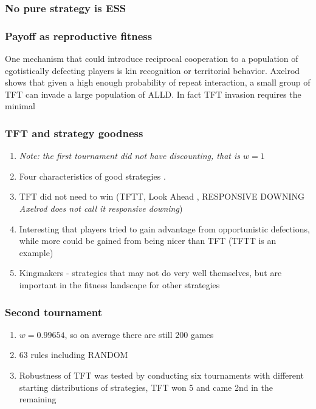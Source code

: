 \subsubsection{No pure strategy is ESS}



\subsubsection{Payoff as reproductive fitness}
One mechanism that could introduce reciprocal cooperation to a population of egotistically defecting players is kin recognition or territorial behavior. Axelrod shows that given a high enough probability of repeat interaction, a small group of TFT can invade a large population of ALLD. In fact TFT invasion requires the minimal 


\subsubsection{TFT and strategy goodness}
\begin{enumerate}
\item \textit{Note: the first tournament did not have discounting, that is $w = 1$}
\item Four characteristics of good strategies \cite[p.110]{axelrod1984evolution}.
\item TFT did not need to win (TFTT, Look Ahead \cite[p.39]{axelrod1984evolution}, RESPONSIVE DOWNING \textit{Axelrod does not call it responsive downing})
\item Interesting that players tried to gain advantage from opportunistic defections, while more could be gained from being nicer than TFT (TFTT is an example)
\item Kingmakers - strategies that may not do very well themselves, but are important in the fitness landscape for other strategies
\end{enumerate}

\subsubsection{Second tournament}
\begin{enumerate}
\item $w = 0.99654$, so on average there are still 200 games
\item 63 rules including RANDOM
\item Robustness of TFT was tested by conducting six tournaments with different starting distributions of strategies, TFT won 5 and came 2nd in the remaining
\end{enumerate}

